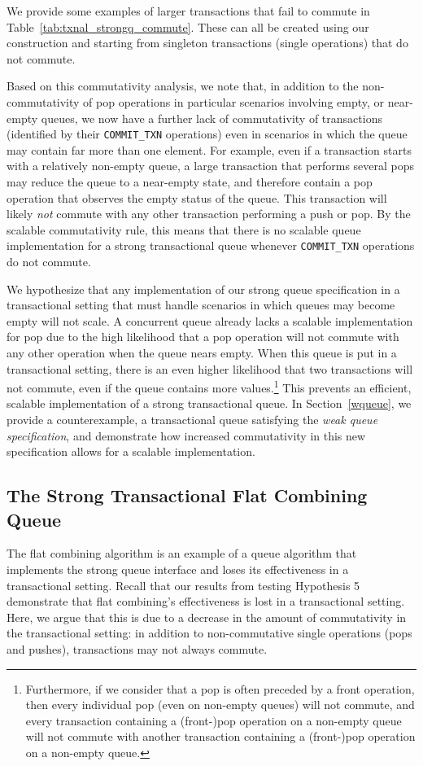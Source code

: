 We provide some examples of larger transactions that fail to commute in Table~\ref{tab:txnal_strongq_commute}. These can all be created using our construction and starting from singleton transactions (single operations) that do not commute.

Based on this commutativity analysis, we note that, in addition to the non-commutativity of pop operations in particular scenarios involving empty, or near-empty queues, we now have a further lack of commutativity of transactions (identified by their \texttt{COMMIT\_TXN} operations) even in scenarios in which the queue may contain far more than one element. For example, even if a transaction starts with a relatively non-empty queue, a large transaction that performs several pops may reduce the queue to a near-empty state, and therefore contain a pop operation that observes the empty status of the queue. This transaction will likely \emph{not} commute with any other transaction performing a push or pop.  By the scalable commutativity rule, this means that there is no scalable queue implementation for a strong transactional queue whenever \texttt{COMMIT\_TXN} operations do not commute.

We hypothesize that any implementation of our strong queue specification in a transactional setting that must handle scenarios in which queues may become empty will not scale. A concurrent queue already lacks a scalable implementation for pop due to the high likelihood that a pop operation will not commute with any other operation when the queue nears empty. When this queue is put in a transactional setting, there is an even higher likelihood that two transactions will not commute, even if the queue contains more values.\footnote{Furthermore, if we consider that a pop is often preceded by a front operation, then every individual pop (even on non-empty queues) will not commute, and every transaction containing a (front-)pop operation on a non-empty queue will not commute with another transaction containing a (front-)pop operation on a non-empty queue.}
This prevents an efficient, scalable implementation of a strong transactional queue. In Section~\ref{wqueue}, we provide a counterexample, a transactional queue satisfying the \emph{weak queue specification}, and demonstrate how increased commutativity in this new specification allows for a scalable implementation.

\subsection{The Strong Transactional Flat Combining Queue}
The flat combining algorithm is an example of a queue algorithm that implements the strong queue interface and loses its effectiveness in a transactional setting. Recall that our results from testing Hypothesis 5 demonstrate that flat combining's effectiveness is lost in a transactional setting. Here, we argue that this is due to a decrease in the amount of commutativity in the transactional setting: in addition to non-commutative single operations (pops and pushes), transactions may not always commute.

